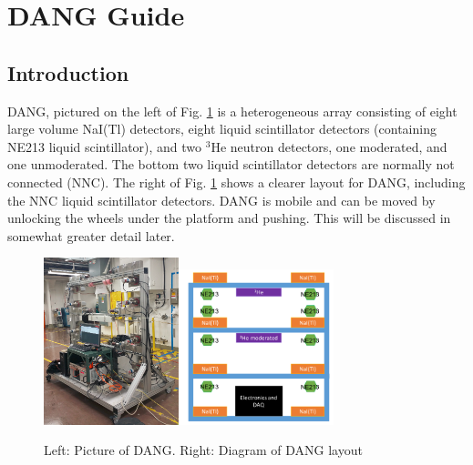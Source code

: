\documentclass[onecolumn, 10pt, letterpaper, twoside]{article}
\newcommand{\nuc}[2] {$^{#1}$#2}
\begin{document}
\section{DANG Guide}
\subsection{Introduction}
DANG, pictured on the left of Fig. \ref{fig:DANG-Pic-Layout} is a heterogeneous array consisting of eight large volume NaI(Tl) detectors, eight liquid scintillator detectors (containing NE213 liquid scintillator), and two \nuc{3}{He} neutron detectors, one moderated, and one unmoderated. The bottom two liquid scintillator detectors are normally not connected (NNC). The right of Fig. \ref{fig:DANG-Pic-Layout} shows a clearer layout for DANG, including the NNC liquid scintillator detectors. DANG is mobile and can be moved by unlocking the wheels under the platform and pushing. This will be discussed in somewhat greater detail later.

\begin{figure}[h!]
\begin{center}
\includegraphics[width=0.35\textwidth]{./DANG_Picture.png}\includegraphics[width=0.4\textwidth]{./DANG_Layout.png}
\caption{Left: Picture of DANG. Right: Diagram of DANG layout}
\label{fig:DANG-Pic-Layout}
\end{center}
\end{figure}
\end{document}
